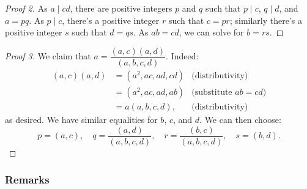 \documentclass[11pt,paper=letter]{scrartcl}
\begin{document}
\begin{proof}[Proof 2]
  As $a \mid cd$, there are positive integers $p$ and $q$ such that $p \mid c$, $q \mid d$, and $a = pq$. As $p \mid c$, there's a positive integer $r$ such that $c = pr$; similarly there's a positive integer $s$ such that $d = qs$. As $ab = cd$, we can solve for $b = rs$.
\end{proof}

\begin{proof}[Proof 3]
  We claim that $ a = \dfrac{(a, c)(a, d)}{(a, b, c, d)} $. Indeed:
  \begin{align*}
    (a, c)(a, d) &= (a^2, ac, ad, cd) & \text{(distributivity)} \\
                 &= (a^2, ac, ad, ab) & \text{(substitute $ab = cd$)} \\
                 &= a(a, b, c, d), & \text{(distributivity)}
  \end{align*}
  as desired. We have similar equalities for $b$, $c$, and $d$. We can then choose: \[
    p = (a, c), \quad
    q = \frac{(a, d)}{(a, b, c, d)}, \quad
    r = \frac{(b, c)}{(a, b, c, d)}, \quad
    s = (b, d).
  \]
\end{proof}

\subsubsection*{Remarks}
\end{document}
